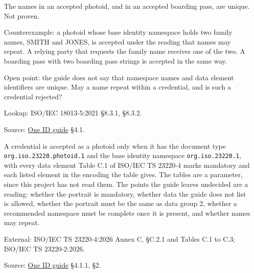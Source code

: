 \begin{theorem}
  \label{thm:names-unique}
  The names in an accepted photoid, and in an accepted boarding pass, are
  unique.  Not proven.

  Counterexample: a photoid whose base identity namespace holds two family
  names, SMITH and JONES, is accepted under the reading that names may
  repeat.  A relying party that requests the family name receives one of the
  two.  A boarding pass with two boarding pass strings is accepted in the same
  way.

  Open point: the guide does not say that namespace names and data element
  identifiers are unique.  May a name repeat within a credential, and is such
  a credential rejected?

  Lookup: ISO/IEC 18013-5:2021 §8.3.1, §8.3.2.

  Source: \href{https://standards.atlassian.net/wiki/spaces/OneID/pages/2947416082/Technical+Implementation+Guide}{One ID guide} §4.1.
\end{theorem}

\begin{definition}
  \label{def:photoid}
  A credential is accepted as a photoid only when it has the document type
  \texttt{org.iso.23220.photoid.1} and the base identity namespace
  \texttt{org.iso.23220.1}, with every data element Table C.1 of ISO/IEC TS
  23220-4 marks mandatory and each listed element in the encoding the table
  gives.  The tables are a parameter, since this project has not read them.
  The points the guide leaves undecided are a reading: whether the portrait
  is mandatory, whether data the guide does not list is allowed, whether the
  portrait must be the same as data group 2, whether a recommended namespace
  must be complete once it is present, and whether names may repeat.

  External: ISO/IEC TS 23220-4:2026 Annex C, §C.2.1 and Tables C.1 to C.3;
  ISO/IEC TS 23220-2:2026.

  Source: \href{https://standards.atlassian.net/wiki/spaces/OneID/pages/2947416082/Technical+Implementation+Guide}{One ID guide} §4.1.1, §2.
\end{definition}


